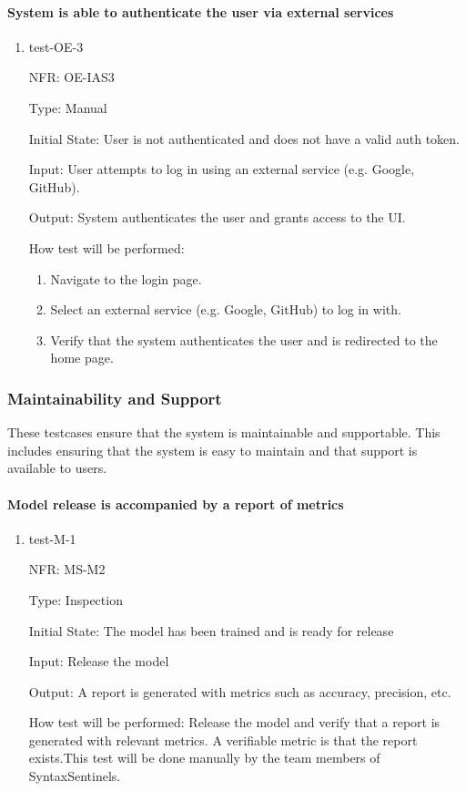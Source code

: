 \documentclass[12pt, titlepage]{article}
\begin{document}
\paragraph{System is able to authenticate the user via external services}
\begin{enumerate}
  \item{test-OE-3}

  NFR: OE-IAS3

  Type: Manual
            
  Initial State: User is not authenticated and does not have a valid auth token.
            
  Input: User attempts to log in using an external service (e.g. Google, GitHub).
            
  Output: System authenticates the user and grants access to the UI.
            
  How test will be performed: 
  \begin{enumerate}
    \item Navigate to the login page.
    \item Select an external service (e.g. Google, GitHub) to log in with.
    \item Verify that the system authenticates the user and is redirected to the home page.
  \end{enumerate}
\end{enumerate}

\subsubsection{Maintainability and Support}
These testcases ensure that the system is maintainable and supportable. This includes ensuring that the system is easy to maintain and that support is available to users.

\paragraph{Model release is accompanied by a report of metrics}

\begin{enumerate}

  \item{test-M-1}

  NFR: MS-M2

  Type: Inspection

  Initial State: The model has been trained and is ready for release

  Input: Release the model

  Output: A report is generated with metrics such as accuracy, precision, etc.

  How test will be performed:
  Release the model and verify that a report is generated with relevant metrics. 
  A verifiable metric is that the report exists.This test will be done manually 
  by the team members of SyntaxSentinels.

\end{enumerate}
\end{document}
